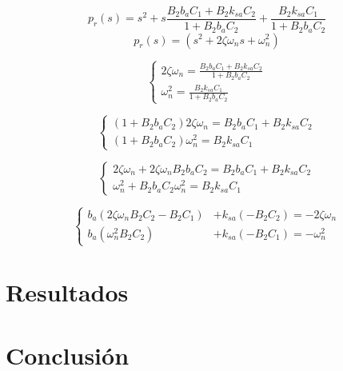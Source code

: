 \documentclass{article}
\begin{document}
            \begin{equation}
                p_r(s)=s^2 + s \frac{B_{2}b_a C_1 +B_{2}k_{sa} C_2 }{1+B_{2}b_a C_2} + \frac{B_{2}k_{sa} C_1}{1+B_{2}b_a C_2}
            \end{equation}
            \begin{equation}
                p_r(s)=(s^2+2\zeta\omega_n s+\omega_n^2)
            \end{equation}

            \begin{equation}
                \begin{cases}
                    2\zeta\omega_n = \frac{B_{2}b_a C_1 +B_{2}k_{sa} C_2 }{1+B_{2}b_a C_2} \\
                    \omega_n^2 = \frac{B_{2}k_{sa} C_1}{1+B_{2}b_a C_2}
                \end{cases}
            \end{equation}

            \begin{equation}
                \begin{cases}
                    (1+B_{2}b_a C_2)2\zeta\omega_n = B_{2}b_a C_1 +B_{2}k_{sa} C_2\\
                    (1+B_{2}b_a C_2)\omega_n^2 = B_{2}k_{sa} C_1
                \end{cases}
            \end{equation}

            \begin{equation}
                \begin{cases}
                    2\zeta\omega_n+ 2\zeta\omega_n B_{2}b_a C_2 = B_{2}b_a C_1 +B_{2}k_{sa} C_2\\
                    \omega_n^2+B_{2}b_a C_2\omega_n^2= B_{2}k_{sa} C_1
                \end{cases}
            \end{equation}

            \begin{equation}
                \begin{cases}
                    b_a(2\zeta\omega_n B_{2}C_2-B_{2}C_1) &+ k_{sa}(-B_{2}C_2) = -2\zeta\omega_n \\
                    b_a(\omega_n^2B_{2}C_2) &+ k_{sa}(-B_{2}C_1) = -\omega_n^2
                \end{cases}
            \end{equation}

            




                    

                




\section{Resultados}\label{sec:results}

\section{Conclusión}\label{sec:conclusion}


%

%
\end{document}
